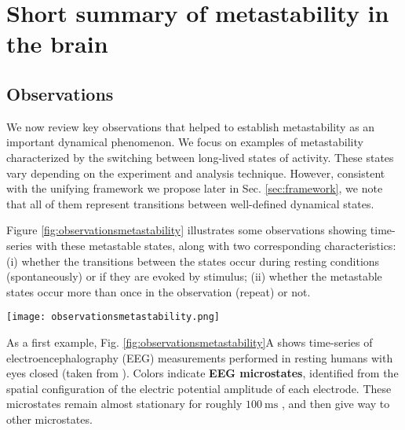 \documentclass[reprint,superscriptaddress,showpacs,amsmath,amssymb,aps,floatfix,nolongbibliography]{revtex4-2}
\theoremstyle{definition}
\newcommand{\Emph}[1]{\textbf{#1}}
\begin{document}
\section{Short summary of metastability in the brain}
\subsection{Observations}
\label{sec:observations}

We now review key observations that helped to establish metastability as an important dynamical phenomenon. We focus on examples of metastability characterized by the switching between long-lived states of activity. These states vary depending on the experiment and analysis technique. However, consistent with the unifying framework we propose later in Sec. \ref{sec:framework}, we note that all of them represent transitions between well-defined dynamical states.

Figure \ref{fig:observationsmetastability} illustrates some observations showing time-series with these metastable states, along with two corresponding characteristics: (i) whether the transitions between the states occur during resting conditions (spontaneously) or if they are evoked by stimulus; (ii) whether the metastable states occur more than once in the observation (repeat) or not.  
%
\begin{figure*}[hbt]
    \centering
    \texttt{[image: observationsmetastability.png]}
    \caption{\textbf{Brain activity typically evolves as a sequence of well-defined states that are transient but long lived.} The panels illustrate important observations taken from the literature, namely EEG microstates \cite{michel2017eeg}, hidden Markov states of firing rates \cite{brinkman2022metastable}, UP and DOWN states \cite{jercog2017updown}, cortical wave patterns \cite{townsend2015emergence}, epileptic seizures \cite{wenzel2019acute}, and bursting in central pattern generators \cite{sakurai2016recruitment}. Each observation is explained in detail in the main text, and is classified into subtypes of metastability that we define in the Sec.~\ref{sec:subtypes}.}
    \label{fig:observationsmetastability}
\end{figure*}

As a first example, Fig. \ref{fig:observationsmetastability}A shows time-series of electroencephalography (EEG) measurements performed in resting humans with eyes closed (taken from \cite{michel2017eeg}). Colors indicate \Emph{EEG microstates}, identified from the spatial configuration of the electric potential amplitude of each electrode. These microstates remain almost stationary for roughly $\SI{100}{\milli\second}$ \cite{vandeville2010eeg, lehmann1987eeg}, and then give way to other microstates.
\end{document}

